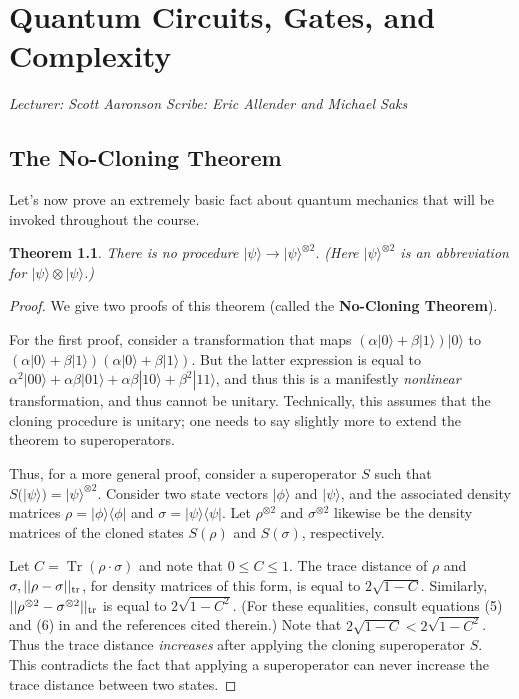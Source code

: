 \documentclass[11pt]{report}
\theoremstyle{plain}
\newtheorem{theorem}{Theorem}[section]
\theoremstyle{definition}
\renewcommand{\ket}[1]{|#1\rangle}
\newcommand{\ketbra}[2]{|#1\rangle\!\langle#2|}
\newcommand{\Tr}{\operatorname{Tr}}
\newcommand{\lecture}[3]{%
  \chapter{#3}%
  \vspace{-5ex}%
  \textit{Lecturer: #1 \hfill Scribe: #2}\par%
  \vspace{1ex}\titlerule\vspace{2ex}}
\begin{document}

\lecture{Scott Aaronson}{Eric Allender and Michael Saks}{Quantum Circuits, Gates, and Complexity}

\section{The No-Cloning Theorem}

Let's now prove an extremely basic fact about quantum mechanics that will be invoked throughout the course.

\begin{theorem}
There is no procedure
$\ket{\psi} \rightarrow \ket{\psi}^{\otimes 2}.$
(Here $\ket{\psi}^{\otimes 2}$ is an abbreviation for $\ket{\psi}\otimes \ket{\psi}$.)
\end{theorem}
\begin{proof}
We give two proofs of this theorem (called the {\bf No-Cloning Theorem}).

For the first proof, consider a transformation that maps
$(\alpha \ket{0} + \beta\ket{1})\ket{0}$
to
$(\alpha \ket{0} + \beta\ket{1}) (\alpha \ket{0} + \beta\ket{1})$.
But the latter expression is equal to
$\alpha^2\ket{00} + \alpha\beta \ket{01} + \alpha\beta\ket{10} + \beta^2 \ket{11}$,
and thus this is a manifestly {\em nonlinear} transformation, and thus cannot
be unitary. Technically, this assumes that the cloning procedure is unitary; one needs to say slightly
more to extend the theorem to superoperators.

Thus, for a more general proof, consider a superoperator $S$ such that
$S(\ket{\psi}) = \ket{\psi}^{\otimes 2}.$  Consider two state vectors
$\ket{\phi}$ and $\ket{\psi}$, and the associated density matrices
$\rho = \ketbra{\phi}{\phi}$ and
$\sigma = \ketbra{\psi}{\psi}$.
Let $\rho^{\otimes 2}$ and $\sigma^{\otimes 2}$ likewise be the density matrices
of the cloned states $S(\rho)$ and $S(\sigma)$, respectively.

Let $C = \Tr(\rho\cdot\sigma)$ and note that $0 \leq C \leq 1$.
The trace distance of
$\rho$ and $\sigma, ||\rho - \sigma||_{\rm tr}$, for density matrices
of this form, is equal to $2\sqrt{1-C}$.  Similarly,
$||\rho^{\otimes 2} - \sigma^{\otimes 2}||_{\rm tr}$ is equal to
$2\sqrt{1-C^2}$.
(For these equalities, consult equations (5) and (6) in
\cite{Maz15} and the references cited
therein.)
Note that $2\sqrt{1-C}< 2\sqrt{1-C^2}$.  Thus the trace distance
{\em increases} after applying the cloning superoperator $S$.
This contradicts the fact that applying a superoperator can never
increase the trace distance between two states.
\end{proof}
\end{document}
